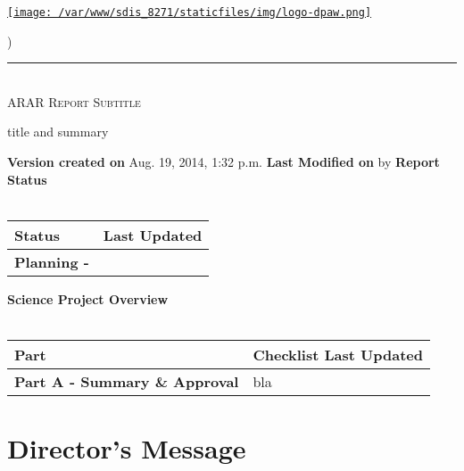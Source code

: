 \documentclass[version=last, paper=a4, DIV=18, usenames, dvipsnames]{scrartcl}
\newcommand{\HRule}{\rule{\linewidth}{0.1pt}}
\begin{document}
\setcounter{secnumdepth}{-1}


\begin{titlepage}
\begin{center}
\begin{minipage}[t]{0.28\textwidth}
\begin{flushleft}
\href{http://www.dpaw.wa.gov.au}{\texttt{[image: /var/www/sdis\_8271/staticfiles/img/logo-dpaw.png]}}
\end{flushleft}
\end{minipage}
\begin{minipage}[b]{0.7\textwidth}
\begin{flushright}
    \href{http://sdis.dpaw.wa.gov.au/pythia/ararreport/1/download/tex/}{}) \\
\end{flushright}
\end{minipage}
\HRule \\[0.4cm]
\vfill
\textsc{\Huge ARAR Report}
\vfill
\textsc{\Huge Subtitle}

\vfill\vfill\vfill\vfill
title and summary

\vfill\vfill\vfill\vfill\vfill\vfill\vfill\vfill

\textbf{Version created on} Aug. 19, 2014, 1:32 p.m.
\vfill
\textbf{Last Modified on}  by 
\vfill\vfill
\textbf{Report Status}\\\,
\begin{tabu} to \linewidth { | X[l] | X | }
\hline
{}
Status & Last Updated \\
\hline
\textbf{Planning - } \\
\hline
\end{tabu}
\vfill
\textbf{Science Project Overview}\\\,
\begin{tabu} to \linewidth { | X[l] | X | }
\hline
{}
Part & Checklist Last Updated \\
\hline
\textbf{Part A - Summary \& Approval} & bla \\
\hline
\end{tabu}

\end{center}
\end{titlepage}

\setcounter{tocdepth}{2}
\tableofcontents
\clearpage



    
    

\section{Director's Message}
\end{document}

